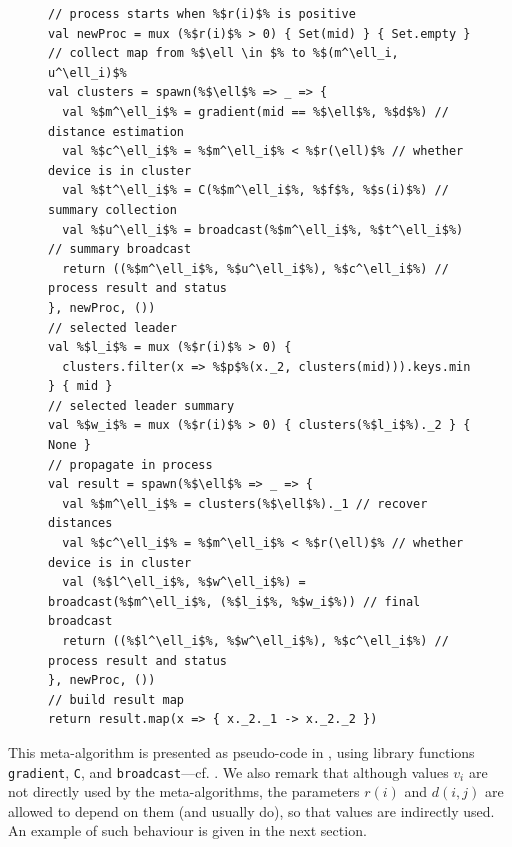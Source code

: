 \begin{figure}
\begin{lstlisting}[escapechar=\%, caption=\scafi{} pseudo-code of the clustering meta-algorithm, label={fig:pseudocode}]
// process starts when %$r(i)$% is positive
val newProc = mux (%$r(i)$% > 0) { Set(mid) } { Set.empty }
// collect map from %$\ell \in $% to %$(m^\ell_i, u^\ell_i)$%
val clusters = spawn(%$\ell$% => _ => {
  val %$m^\ell_i$% = gradient(mid == %$\ell$%, %$d$%) // distance estimation
  val %$c^\ell_i$% = %$m^\ell_i$% < %$r(\ell)$% // whether device is in cluster
  val %$t^\ell_i$% = C(%$m^\ell_i$%, %$f$%, %$s(i)$%) // summary collection
  val %$u^\ell_i$% = broadcast(%$m^\ell_i$%, %$t^\ell_i$%) // summary broadcast
  return ((%$m^\ell_i$%, %$u^\ell_i$%), %$c^\ell_i$%) // process result and status
}, newProc, ())
// selected leader
val %$l_i$% = mux (%$r(i)$% > 0) {
  clusters.filter(x => %$p$%(x._2, clusters(mid))).keys.min
} { mid }
// selected leader summary
val %$w_i$% = mux (%$r(i)$% > 0) { clusters(%$l_i$%)._2 } { None }
// propagate in process
val result = spawn(%$\ell$% => _ => {
  val %$m^\ell_i$% = clusters(%$\ell$%)._1 // recover distances
  val %$c^\ell_i$% = %$m^\ell_i$% < %$r(\ell)$% // whether device is in cluster
  val (%$l^\ell_i$%, %$w^\ell_i$%) = broadcast(%$m^\ell_i$%, (%$l_i$%, %$w_i$%)) // final broadcast
  return ((%$l^\ell_i$%, %$w^\ell_i$%), %$c^\ell_i$%) // process result and status
}, newProc, ())
// build result map
return result.map(x => { x._2._1 -> x._2._2 })
\end{lstlisting}
\end{figure}

This meta-algorithm is presented as \scafi{} pseudo-code in , using \scafi{} library functions \lstinline|gradient|, \lstinline|C|, and \lstinline|broadcast|---cf. .
%
%
 We also remark that although values $v_i$ are not directly used by the meta-algorithms, the parameters $r(i)$ and $d(i,j)$ are allowed to depend on them (and usually do),
 so that values are indirectly used. An example of such behaviour is given in the next section.

